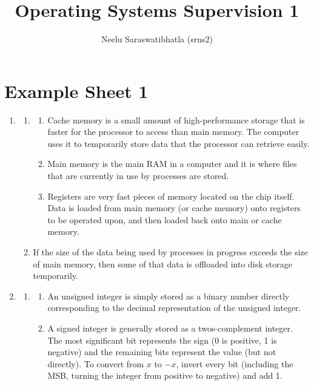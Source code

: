 \documentclass[12pt]{article}
\author{Neelu Saraswatibhatla (srns2)}
\title{Operating Systems Supervision 1}
\date{\vspace{-5ex}}
\begin{document}
\maketitle

\section{Example Sheet 1}
\begin{enumerate}
      \item \begin{enumerate}
                  \item \begin{enumerate}
                              \item Cache memory is a small amount of high-performance storage that is faster for the processor to access than main memory. The computer uses it to temporarily store data that the processor can retrieve easily.
                              \item Main memory is the main RAM in a computer and it is where files that are currently in use by processes are stored.
                              \item Registers are very fast pieces of memory located on the chip itself. Data is loaded from main memory (or cache memory) onto registers to be operated upon, and then loaded back onto main or cache memory.
                        \end{enumerate}
                  \item If the size of the data being used by processes in progress exceeds the size of main memory, then some of that data is offloaded into disk storage temporarily.
            \end{enumerate}
      \item \begin{enumerate}
                  \item \begin{enumerate}
                              \item An unsigned integer is simply stored as a binary number directly corresponding to the decimal representation of the unsigned integer.
                              \item A signed integer is generally stored as a twos-complement integer. The most significant bit represents the sign (0 is positive, 1 is negative) and the remaining bits represent the value (but not directly). To convert from $x$ to $-x$, invert every bit (including the MSB, turning the integer from positive to negative) and add 1.

\end{enumerate}
\end{enumerate}
\end{enumerate}
\end{document}
